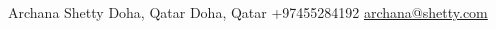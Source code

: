 \documentclass[lighthipster]{simplehipstercv}
\newlength{\rightcolwidth}
\begin{document}
\begin{paracol}{2}
\begin{minipage}[t]{0.3\textwidth}
\end{minipage}

\vfill{} 

\setlength{\parindent}{0pt}
\begin{minipage}[t]{\rightcolwidth}
\begin{center}\fontfamily{\sfdefault}\selectfont \color{black!70}
{\small Archana Shetty  Doha, Qatar  Doha, Qatar  +97455284192 \newline{} \protect\url{archana@shetty.com}
}
\end{center}
\end{minipage}

\end{paracol}
\end{document}
